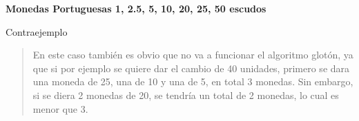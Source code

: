 \textbf{Monedas Portuguesas 1, 2.5, 5, 10, 20, 25, 50 escudos}\vspace{.2cm}

\textcolor{bibi}{Contraejemplo}
\begin{quote}
    En este caso también es obvio que no va a funcionar el algoritmo glotón, ya que si por ejemplo se quiere dar el cambio de 40 unidades, primero se dara una moneda de 25, una de 10 y una de 5, en total 3 monedas. Sin embargo, si se diera 2 monedas de 20, se tendría un total de 2 monedas, lo cual es menor que 3.
\end{quote}